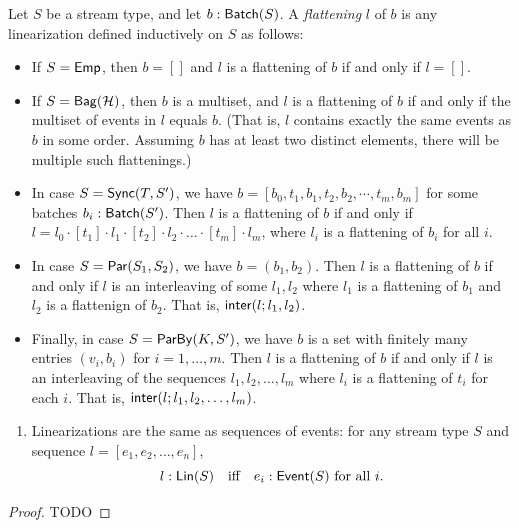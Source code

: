 \begin{definition}[Flattening]
    \label{def:batch-flattening}
    Let $S$ be a stream type,
    and let $b: \mathsf{Batch}({S})$.
    A \emph{flattening} $l$ of $b$ is any linearization
    defined inductively on $S$ as follows:
\begin{itemize}
\item If $S = \mathsf{Emp}{}$, then $b = []$ and $l$ is a flattening of $b$ if and only if $l = []$.
\item If $S = \mathsf{Bag}({\mathcal{H}})$, then $b$ is a multiset, and $l$ is a flattening of $b$ if and only if the multiset of events in $l$ equals $b$.
(That is, $l$ contains exactly the same events as $b$ in some order. Assuming $b$ has at least two distinct elements, there will be multiple such flattenings.)
\item In case $S = \mathsf{Sync}({T}, S')$, we have $b = [b_0, t_1, b_1, t_2, b_2, \cdots, t_m, b_m]$ for some batches $b_i: \mathsf{Batch}({S'})$.
Then $l$ is a flattening of $b$ if and only if $l = l_0 \cdot [t_1] \cdot l_1 \cdot [t_2] \cdot l_2 \cdot \ldots \cdot [t_m] \cdot l_m$,
where $l_i$ is a flattening of $b_i$ for all $i$.
\item In case $S = \mathsf{Par}({S_1}, {S_2})$, we have $b = (b_1, b_2)$.
Then $l$ is a flattening of $b$ if and only if $l$ is an interleaving of some $l_1, l_2$ where $l_1$ is a flattening of $b_1$ and $l_2$ is a flattenign of $b_2$.
That is, $\mathsf{inter}(l; l_1, l_2)$.
\item Finally, in case $S = \mathsf{ParBy}({K}, S')$, we have $b$ is a set with finitely many entries $(v_i, b_i)$ for $i = 1, \ldots, m$.
Then $l$ is a flattening of $b$ if and only if $l$ is an interleaving of the sequences $l_1, l_2, \ldots, l_m$
where $l_i$ is a flattening of $t_i$ for each $i$.
That is, $\mathsf{inter}(l; l_1, l_2, \ldots, l_m)$.
\end{itemize}
\end{definition}

\begin{proposition}
\label{prop:lin-event-correspondence}
\begin{enumerate}
\item Linearizations are the same as sequences of events:
for any stream type $S$ and sequence $l = [e_1, e_2, \ldots, e_n]$,
\[
l: \mathsf{Lin}({S}) \quad \text{iff} \quad e_i: \mathsf{Event}({S}) \text{ for all } i.
\]
\end{enumerate}
\end{proposition}
\begin{proof}
TODO
\end{proof}

